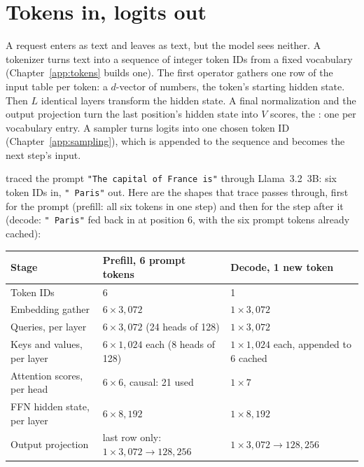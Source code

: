 \section{Tokens in, logits out}

A request enters as text and leaves as text, but the model sees neither.
A tokenizer turns text into a sequence of integer token IDs from a fixed
vocabulary (Chapter~\ref{app:tokens} builds one). The first operator gathers
one row of the input table per token: a $d$-vector of numbers, the token's
starting hidden state. Then $L$ identical layers transform the hidden state.
A final normalization and the output projection turn the last position's
hidden state into $V$ scores, the : one per vocabulary entry. A
sampler turns logits into one chosen token ID (Chapter~\ref{app:sampling}),
which is appended to the sequence and becomes the next step's input.

 traced the prompt \texttt{"The capital of France is"}
through Llama~3.2~3B: six token IDs in, \texttt{" Paris"} out. Here are the
shapes that trace passes through, first for the prompt (prefill: all six
tokens in one step) and then for the step after it (decode: \texttt{" Paris"}
fed back in at position 6, with the six prompt tokens already cached):

\begin{center}\small
\begin{tabular}{@{}lll@{}}
\toprule
Stage & Prefill, 6 prompt tokens & Decode, 1 new token \\
\midrule
Token IDs & 6 & 1 \\
Embedding gather & $6 \times 3{,}072$ & $1 \times 3{,}072$ \\
Queries, per layer & $6 \times 3{,}072$ (24 heads of 128) & $1 \times 3{,}072$ \\
Keys and values, per layer & $6 \times 1{,}024$ each (8 heads of 128) & $1 \times 1{,}024$ each, appended to 6 cached \\
Attention scores, per head & $6 \times 6$, causal: 21 used & $1 \times 7$ \\
FFN hidden state, per layer & $6 \times 8{,}192$ & $1 \times 8{,}192$ \\
Output projection & last row only: $1 \times 3{,}072 \rightarrow 128{,}256$ & $1 \times 3{,}072 \rightarrow 128{,}256$ \\
\bottomrule
\end{tabular}
\end{center}

